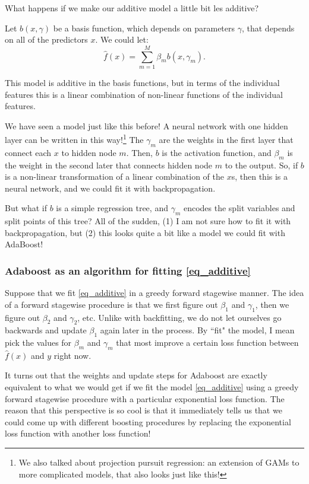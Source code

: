 What happens if we make our additive model a little bit les additive? 

Let $b(x, \gamma)$ be a basis function, which depends on parameters $\gamma$, that depends on all of the predictors $x$. We could let: 
\begin{equation}
\label{eq_additive}	
\hat{f}(x) = \sum_{m=1}^M \beta_m b(x, \gamma_m). 
\end{equation}

This model is additive in the basis functions, but in terms of the individual features this is a linear combination of non-linear functions of the individual features. 

We have seen a model just like this before! A neural network with one hidden layer can be written in this way!\footnote{We also talked about projection pursuit regression: an extension of GAMs to more complicated models, that also looks just like this!} The $\gamma_m$ are the weights in the first layer that connect each $x$ to hidden node $m$. Then, $b$ is the activation function, and $\beta_m$ is the weight in the second later that connects hidden node $m$ to the output. So, if $b$ is a non-linear transformation of a linear combination of the $x$s, then this is a neural network, and we could fit it with backpropagation. 

But what if $b$ is a simple regression tree, and $\gamma_m$ encodes the split variables and split points of this tree? All of the sudden, (1) I am not sure how to fit it with backpropagation, but (2) this looks quite a bit like a model we could fit with AdaBoost!

\subsubsection{Adaboost as an algorithm for fitting \eqref{eq_additive}}

Suppose that we fit \eqref{eq_additive} in a greedy forward stagewise manner. The idea of a forward stagewise procedure is that we first figure out $\beta_1$ and $\gamma_1$, then we figure out $\beta_2$ and $\gamma_2$, etc. Unlike with backfitting, we do not let ourselves go backwards and update $\beta_1$ again later in the process. By ``fit" the model, I mean pick the values for $\beta_m$ and $\gamma_m$ that most improve a certain loss function between $\hat{f}(x)$ and $y$ right now. 

It turns out that the weights and update steps for Adaboost are exactly equivalent to what we would get if we fit the model \eqref{eq_additive} using a greedy forward stagewise procedure with a particular exponential loss function. The reason that this perspective is so cool is that it immediately tells us that we could come up with different boosting procedures by replacing the exponential loss function with another loss function! 

